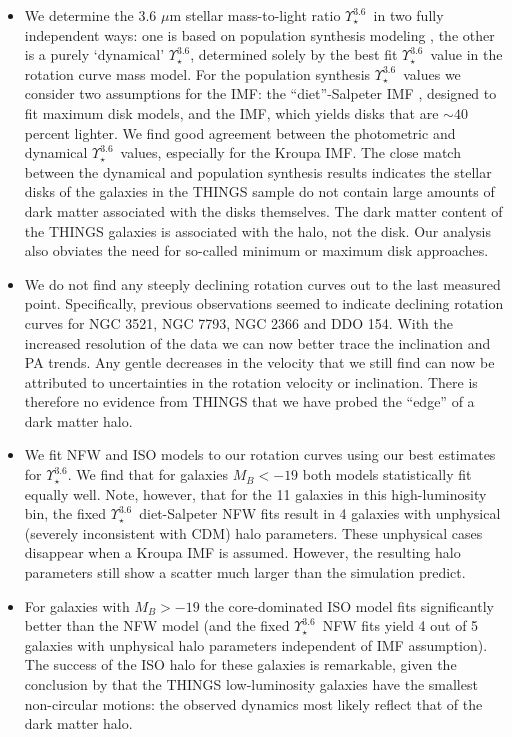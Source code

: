 \documentclass[usenatbib,usegraphicx,apjfonts,floatfix]{emulateapj}
\newcommand{\Ups}{\ensuremath{\Upsilon_{\star}^{3.6}}}
\begin{document}
\begin{itemize}

\item We determine the 3.6 $\mu$m stellar mass-to-light ratio \Ups\ in
  two fully independent ways: one is based on population synthesis
  modeling \citep{oh2007}, the other is a purely `dynamical' \Ups,
  determined solely by the best fit \Ups\ value in the rotation curve
  mass model.  For the population synthesis \Ups\ values we consider
  two assumptions for the IMF: the ``diet''-Salpeter IMF
  \citep{bell_dejong}, designed to fit maximum disk models, and the
  \citet{kroupa} IMF, which yields disks that are $\sim 40$ percent
  lighter.  We find good agreement between the photometric and
  dynamical \Ups\ values, especially for the Kroupa IMF.  The close
  match between the dynamical and population synthesis results
  indicates the stellar disks of the galaxies in the THINGS sample do
  not contain large amounts of dark matter associated with the
  disks themselves. The dark matter content of the THINGS galaxies is
  associated with the halo, not the disk. Our analysis also obviates
  the need for so-called minimum or maximum disk approaches.

\item We do not find any steeply declining rotation curves out to the
  last measured point. Specifically, previous observations seemed to
  indicate declining rotation curves for NGC 3521, NGC 7793, NGC 2366
  and DDO 154. With the increased resolution of the data we can now
  better trace the inclination and PA trends.  Any gentle decreases in
  the velocity that we still find can now be attributed to
  uncertainties in the rotation velocity or inclination.  There is
  therefore no evidence from THINGS that we have probed the ``edge''
  of a dark matter halo.

\item We fit NFW and ISO models to our rotation curves using our best
  estimates for \Ups. We find that for galaxies $M_B < -19$ both
  models statistically fit equally well. Note, however, that for the
  11 galaxies in this high-luminosity bin, the fixed \Ups\ diet-Salpeter
  NFW fits result in 4 galaxies with unphysical (severely inconsistent
  with CDM) halo parameters. These unphysical cases disappear when a
  Kroupa IMF is assumed. However, the resulting halo parameters still
  show a scatter much larger than the simulation predict.

\item For galaxies with $M_B > -19$ the core-dominated ISO model fits
  significantly better than the NFW model (and the fixed \Ups\ NFW
  fits yield 4 out of 5 galaxies with unphysical halo parameters
  independent of IMF assumption). The success of the ISO halo for
  these galaxies is remarkable, given the conclusion by
  \citet{clemens2007} that the THINGS low-luminosity galaxies have the
  smallest non-circular motions: the observed dynamics most likely
  reflect that of the dark matter halo.
	

\end{itemize}
\end{document}
